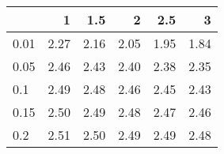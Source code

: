 
\begin{tabular}{lrrrrr}
\toprule
  & 1 & 1.5 & 2 & 2.5 & 3\\
\midrule
0.01 & 2.27 & 2.16 & 2.05 & 1.95 & 1.84\\
0.05 & 2.46 & 2.43 & 2.40 & 2.38 & 2.35\\
0.1 & 2.49 & 2.48 & 2.46 & 2.45 & 2.43\\
0.15 & 2.50 & 2.49 & 2.48 & 2.47 & 2.46\\
0.2 & 2.51 & 2.50 & 2.49 & 2.49 & 2.48\\
\bottomrule
\end{tabular}
